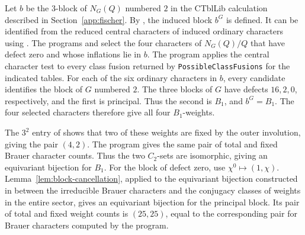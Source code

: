 \documentclass[10pt]{amsart}
\theoremstyle{definition}
\let\oldendproof\endproof
\renewenvironment{proof}[1][\proofname]{%
  \oldproof[\bfseries #1]%
}{\oldendproof}
\numberwithin{equation}{section}
\numberwithin{table}{section}
\begin{document}
\begin{proof}
Let $b$ be the $3$-block of $N_G(Q)$ numbered $2$ in the CTblLib
calculation described in Section~\ref{app:fischer}. By \cite[Theorem~4.14]{Navarro1998}, the induced block $b^G$ is defined.
It can be identified from the reduced central characters of induced
ordinary characters using \cite[Lemma~6.1]{Navarro1998}.  The programs  and  select the four
characters of $N_G(Q)/Q$ that have defect zero and whose inflations
lie in $b$. The program  applies the central character test to
every class fusion returned by \texttt{PossibleClassFusions} for the
indicated tables.
For each of the six ordinary characters in $b$, every candidate
identifies the block of $G$ numbered $2$. The three blocks of $G$ have defects
$16,2,0$, respectively, and the first is principal. Thus the second is
$B_1$, and $b^G=B_1$. The four selected characters therefore give all
four $B_1$-weights.

The $3^2$ entry of \cite[Table~8]{AnDietrich2012} shows that two of these
weights are fixed by the outer involution, giving the pair $(4,2)$.
The program  gives the same pair of total and fixed
Brauer character counts.  Thus the two $C_2$-sets are isomorphic, giving an equivariant
bijection for $B_1$. For the block of defect zero, use $\chi^0\mapsto(1,\chi)$.  Lemma~\ref{lem:block-cancellation}, applied to the equivariant bijection
constructed in \cite[Section~4.3.4]{AnDietrich2012} between the irreducible
Brauer characters and the conjugacy classes of weights in the entire sector,
gives an equivariant bijection for the principal block.  Its pair of total and fixed weight counts is $(25,25)$, equal to the
corresponding pair for Brauer characters computed by the program.


\end{proof}
\end{document}
